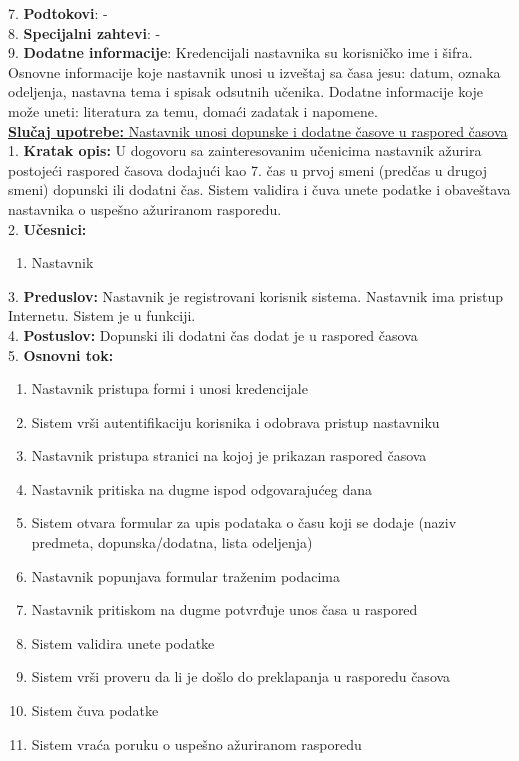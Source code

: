 \documentclass{article}
\begin{document}
7. \textbf{Podtokovi}: - \\

8. \textbf{Specijalni zahtevi}: - \\

9. \textbf{Dodatne informacije}: Kredencijali nastavnika su korisničko ime i šifra. Osnovne informacije koje nastavnik unosi u izveštaj sa časa jesu: datum, oznaka odeljenja, nastavna tema i spisak odsutnih učenika. Dodatne informacije koje može uneti: literatura za temu, domaći zadatak i napomene.\\

\underline{\textbf{Slučaj upotrebe:} Nastavnik unosi dopunske i dodatne časove u raspored časova } \\

1. \textbf{Kratak opis:} U dogovoru sa zainteresovanim učenicima nastavnik ažurira postojeći raspored časova dodajući kao 7. čas u prvoj smeni (predčas u drugoj smeni) dopunski ili dodatni čas. Sistem validira i čuva unete podatke i obaveštava nastavnika o uspešno ažuriranom rasporedu. \\

2. \textbf{Učesnici:}
\begin{enumerate} [label=(\alph*)]
\item Nastavnik
\end{enumerate} 

3. \textbf{Preduslov:} Nastavnik je registrovani korisnik sistema. Nastavnik ima pristup Internetu. Sistem je u funkciji. \\

4. \textbf{Postuslov:} Dopunski ili dodatni čas dodat je u raspored časova \\

5. \textbf{Osnovni tok:} 
\begin{enumerate} [label=(\alph*)]
\item Nastavnik pristupa formi i unosi kredencijale 
\item Sistem vrši autentifikaciju korisnika i odobrava pristup nastavniku
\item Nastavnik pristupa stranici na kojoj je prikazan raspored časova
\item Nastavnik pritiska na dugme ispod odgovarajućeg dana  
\item Sistem otvara formular za upis podataka o času koji se dodaje (naziv predmeta, dopunska/dodatna, lista odeljenja)
\item Nastavnik popunjava formular traženim podacima
\item Nastavnik pritiskom na dugme potvrđuje unos časa u raspored
\item Sistem validira unete podatke
\item Sistem vrši proveru da li je došlo do preklapanja u rasporedu časova
\item Sistem čuva podatke
\item Sistem vraća poruku o uspešno ažuriranom rasporedu
\end{enumerate}
\end{document}
